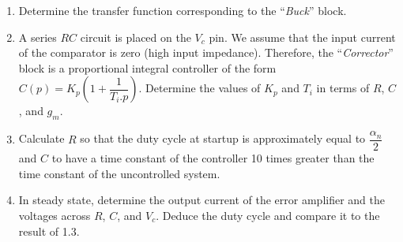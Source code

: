 \begin{enumerate}
\begin{enumerate}
\item Determine the transfer function corresponding to the ``\textit{Buck}'' block.

\item A series $RC$ circuit is placed on the $V_c$ pin. We assume that the input current of the comparator is zero (high input impedance). Therefore, the ``\textit{Corrector}'' block is a proportional integral controller of the form $C(p) = K_p(1+\dfrac{1}{T_i.p})$. Determine the values of $K_p$ and $T_i$ in terms of $R$, $C$, and $g_m$.

\item Calculate $R$ so that the duty cycle at startup is approximately equal to $\dfrac{\alpha_n}{2}$ and $C$ to have a time constant of the controller 10 times greater than the time constant of the uncontrolled system.

\item In steady state, determine the output current of the error amplifier and the voltages across $R$, $C$, and $V_c$. Deduce the duty cycle and compare it to the result of 1.3.

\end{enumerate}

\end{enumerate}

\newpage


